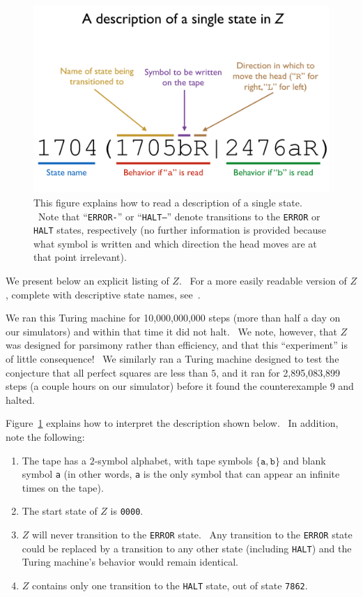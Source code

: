 \documentclass[11pt]{article}
\newcommand{\zhaltstate}{\texttt{7862}}
\begin{document}
\begin{appendices}
\begin{figure}[h]
\begin{center}
\includegraphics[scale=0.4]{figs/syntax.png}
\caption{This figure explains how to read a description of a single state. \ Note that ``\texttt{ERROR-}'' or ``\texttt{HALT--}'' denote transitions to the \texttt{ERROR} or \texttt{HALT} states, respectively (no further information is provided because what symbol is written and which direction the head moves are at that point irrelevant). \label{fig:syntax}}
\end{center}
\end{figure}

We present below an explicit listing of $Z$. \ For a more easily readable version of $Z$, complete with descriptive state names, see~\cite{github}.

We ran this Turing machine for 10,000,000,000 steps (more than half a day on our simulators) and within that time it did not halt. \ We note, however, that $Z$ was designed for parsimony rather than efficiency, and that this ``experiment'' is of little consequence! \ We similarly ran a Turing machine designed to test the conjecture that all perfect squares are less than $5$, and it ran for 2,895,083,899 steps (a couple hours on our simulator) before it found the counterexample $9$ and halted.

Figure~\ref{fig:syntax} explains how to interpret the description shown below. \ In addition, note the following:

\begin{enumerate}

\item The tape has a $2$-symbol alphabet, with tape symbols $\{\texttt{a}, \texttt{b}\}$ and blank symbol \texttt{a} (in other words, \texttt{a} is the only symbol that can appear an infinite times on the tape).
\item The start state of $Z$ is \texttt{0000}.
\item $Z$ will never transition to the \texttt{ERROR} state. \ Any transition to the \texttt{ERROR} state could be replaced by a transition to any other state (including \texttt{HALT}) and the Turing machine's behavior would remain identical.
\item $Z$ contains only one transition to the \texttt{HALT} state, out of state \zhaltstate.


\end{enumerate}
\end{appendices}
\end{document}
